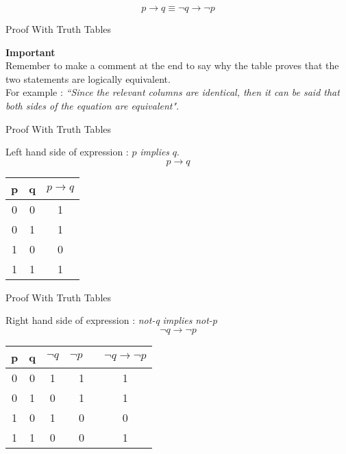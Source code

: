 \documentclass[12pt]{article}
\begin{document}
\[ p \rightarrow q \equiv \neg q \rightarrow \neg p\]


{Proof With Truth Tables}

\textbf{Important}\\ 
Remember to make a comment at the end to say why the table proves that the two statements are logically equivalent. \\ For example : \emph{``Since the relevant columns are identical, then it can be said that both sides of the equation are equivalent"}.


{Proof With Truth Tables}

Left hand side of expression : $p$ \textit{implies} $q$.
\[p \rightarrow q\]
\begin{center}
\begin{tabular}{|c|c||c|}
\hline  \phantom{spa}p\phantom{spa}&  \phantom{spa}q\phantom{spa}& \phantom{sp}$p \rightarrow q$ \phantom{sp} \\ 
\hline  0&  0&  1\\ 
\hline  0&  1&  1\\ 
\hline  1&  0&  0\\ 
\hline  1&  1&  1\\ 
\hline 
\end{tabular} 
\end{center}



{Proof With Truth Tables}

Right hand side of expression : \textit{not-q} \textit{implies} \textit{not-p}
\[\neg q \rightarrow \neg p\]
\begin{center}
\begin{tabular}{|c|c||c|c|c|}
\hline  \phantom{sp}p\phantom{sp}&  \phantom{sp}q\phantom{sp}&\phantom{sp} $\neg q$ \phantom{sp} & \phantom{sp} $\neg p \phantom{sp}$ & $\neg q \rightarrow \neg p$ \\ 
\hline  0&  0& 1& 1& 1\\ 
\hline  0&  1& 0& 1& 1\\ 
\hline  1&  0& 1& 0& 0\\ 
\hline  1&  1& 0& 0& 1\\ 
\hline 
\end{tabular}
\end{center}
\end{document}
